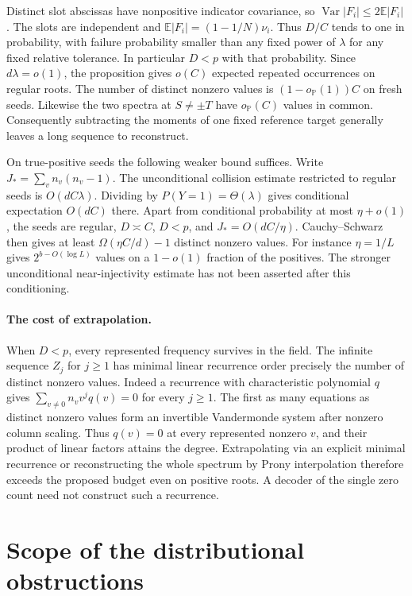\documentclass[11pt]{article}
\newcommand{\E}{\mathbb E}
\newcommand{\Prb}{\mathbb P}
\begin{document}
Distinct slot abscissas have nonpositive indicator covariance, so
$\operatorname{Var}|F_i|\le2\E|F_i|$. The slots are independent and
$\E|F_i|=(1-1/N)\nu_i$. Thus $D/C$ tends to one in probability, with
failure probability smaller than any fixed power of $\lambda$ for any
fixed relative tolerance. In particular $D<p$ with that probability.
Since $d\lambda=o(1)$, the proposition gives $o(C)$ expected repeated
occurrences on regular roots. The number of distinct nonzero values is
$(1-o_{\Prb}(1))C$ on fresh seeds. Likewise the two spectra at $S\ne\pm T$
have $o_{\Prb}(C)$ values in common. Consequently subtracting the
moments of one fixed reference target generally leaves a long sequence
to reconstruct.

On true-positive seeds the following weaker bound suffices. Write
$J_*= \sum_v n_v(n_v-1)$. The unconditional collision estimate
restricted to regular seeds is $O(dC\lambda)$. Dividing by
$P(Y=1)=\Theta(\lambda)$ gives conditional expectation $O(d C)$ there.
Apart from conditional probability at most $\eta+o(1)$, the seeds are
regular, $D\asymp C$, $D<p$, and $J_*=O(dC/\eta)$.
Cauchy--Schwarz then gives at least $\Omega(\eta C/d)-1$ distinct
nonzero values. For instance $\eta=1/L$ gives $2^{b-O(\log L)}$ values
on a $1-o(1)$ fraction of the positives. The stronger unconditional
near-injectivity estimate has not been asserted after this conditioning.

\paragraph{The cost of extrapolation.}
When $D<p$, every represented frequency survives in the field.
The infinite sequence $Z_j$ for $j\ge1$ has minimal linear recurrence
order precisely the number of distinct nonzero values. Indeed a
recurrence with characteristic polynomial $q$ gives
$\sum_{v\ne0} n_v v^j q(v)=0$ for every $j\ge1$. The first as many
equations as distinct nonzero values form an invertible Vandermonde
system after nonzero column scaling. Thus $q(v)=0$ at every represented
nonzero $v$, and their product of linear factors attains the degree.
Extrapolating via an explicit minimal recurrence or reconstructing the
whole spectrum by Prony interpolation therefore exceeds the proposed
budget even on positive roots. A decoder of the single zero count need
not construct such a recurrence.

\section{Scope of the distributional obstructions}
\end{document}
